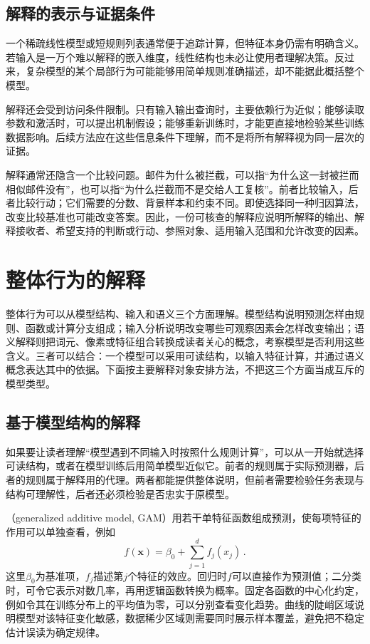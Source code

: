 \subsection{解释的表示与证据条件}

一个稀疏线性模型或短规则列表通常便于追踪计算，但特征本身仍需有明确含义。若输入是一万个难以解释的嵌入维度，线性结构也未必让使用者理解决策。反过来，复杂模型的某个局部行为可能能够用简单规则准确描述，却不能据此概括整个模型。

解释还会受到访问条件限制。只有输入输出查询时，主要依赖行为近似；能够读取参数和激活时，可以提出机制假设；能够重新训练时，才能更直接地检验某些训练数据影响。后续方法应在这些信息条件下理解，而不是将所有解释视为同一层次的证据。

解释通常还隐含一个比较问题。邮件为什么被拦截，可以指“为什么这一封被拦而相似邮件没有”，也可以指“为什么拦截而不是交给人工复核”。前者比较输入，后者比较行动；它们需要的分数、背景样本和约束不同。即使选择同一种归因算法，改变比较基准也可能改变答案。因此，一份可核查的解释应说明所解释的输出、解释接收者、希望支持的判断或行动、参照对象、适用输入范围和允许改变的因素。

\section{整体行为的解释}
\label{sec:interpretability-global}

整体行为可以从模型结构、输入和语义三个方面理解。模型结构说明预测怎样由规则、函数或计算分支组成；输入分析说明改变哪些可观察因素会怎样改变输出；语义解释则把词元、像素或特征组合转换成读者关心的概念，考察模型是否利用这些含义。三者可以结合：一个模型可以采用可读结构，以输入特征计算，并通过语义概念表达其中的依据。下面按主要解释对象安排方法，不把这三个方面当成互斥的模型类型。

\subsection{基于模型结构的解释}
\label{sec:interpretability-global-response}

如果要让读者理解“模型遇到不同输入时按照什么规则计算”，可以从一开始就选择可读结构，或者在模型训练后用简单模型近似它。前者的规则属于实际预测器，后者的规则属于解释用的代理。两者都能提供整体说明，但前者需要检验任务表现与结构可理解性，后者还必须检验是否忠实于原模型。

（generalized additive model, GAM）用若干单特征函数组成预测，使每项特征的作用可以单独查看，例如
\begin{equation}
 f(\bm{x})=\beta_0+\sum_{j=1}^{d}f_j(x_j)\, .
 \label{eq:interpretability-gam}
\end{equation}
这里$\beta_0$为基准项，$f_j$描述第$j$个特征的效应。回归时$f$可以直接作为预测值；二分类时，可令它表示对数几率，再用逻辑函数转换为概率。固定各函数的中心化约定，例如令其在训练分布上的平均值为零，可以分别查看变化趋势。曲线的陡峭区域说明模型对该特征变化敏感，数据稀少区域则需要同时展示样本覆盖，避免把不稳定估计误读为确定规律。

